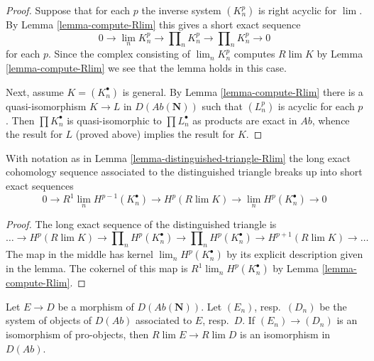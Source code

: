 \begin{proof}
Suppose that for each $p$ the inverse system $(K_n^p)$ is right
acyclic for $\lim$. By Lemma \ref{lemma-compute-Rlim}
this gives a short exact sequence
$$
0 \to \lim_n K^p_n \to \prod\nolimits_n K^p_n \to \prod\nolimits_n K^p_n \to 0
$$
for each $p$. Since the complex consisting of $\lim_n K^p_n$
computes $R\lim K$ by Lemma \ref{lemma-compute-Rlim} we see that the
lemma holds in this case.

\medskip\noindent
Next, assume $K = (K_n^\bullet)$ is general. By Lemma \ref{lemma-compute-Rlim}
there is a quasi-isomorphism $K \to L$ in $D(\textit{Ab}(\mathbf{N}))$
such that $(L_n^p)$ is acyclic for each $p$. Then $\prod K_n^\bullet$
is quasi-isomorphic to $\prod L_n^\bullet$ as products are exact in
$\textit{Ab}$, whence the result for $L$ (proved above) implies the
result for $K$.
\end{proof}

\begin{lemma}
\label{lemma-break-long-exact-sequence}
With notation as in Lemma \ref{lemma-distinguished-triangle-Rlim}
the long exact cohomology sequence associated to the distinguished
triangle breaks up into short exact sequences
$$
0 \to R^1\lim_n H^{p - 1}(K_n^\bullet) \to
H^p(R\lim K) \to
\lim_n H^p(K_n^\bullet) \to 0
$$
\end{lemma}

\begin{proof}
The long exact sequence of the distinguished triangle is
$$
\ldots \to H^p(R\lim K) \to \prod\nolimits_n H^p(K_n^\bullet)
\to \prod\nolimits_n H^p(K_n^\bullet) \to
H^{p + 1}(R\lim K) \to \ldots
$$
The map in the middle has kernel $\lim_n H^p(K_n^\bullet)$ by its
explicit description given in the lemma.
The cokernel of this map is $R^1\lim_n H^p(K_n^\bullet)$
by Lemma \ref{lemma-compute-Rlim}.
\end{proof}

\begin{lemma}
\label{lemma-Rlim-pro-equal}
Let $E \to D$ be a morphism of $D(\textit{Ab}(\mathbf{N}))$.
Let $(E_n)$, resp.\ $(D_n)$ be the system of objects of
$D(\textit{Ab})$ associated to $E$, resp.\ $D$.
If $(E_n) \to (D_n)$ is an isomorphism of pro-objects, then
$R\lim E \to R\lim D$ is an isomorphism in $D(\textit{Ab})$.
\end{lemma}

